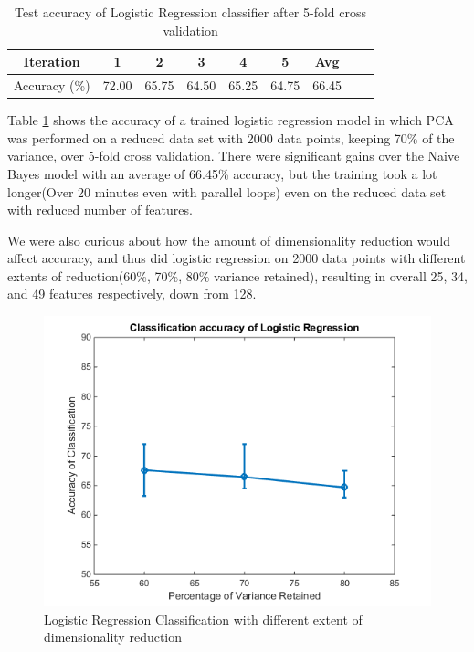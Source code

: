 \documentclass{article} %
\begin{document}
\begin{table}[h]
\centering
\begin{tabular}{|c|c|c|c|c|c|c|c|c|}
\hline
Iteration & 1 & 2 & 3 & 4 & 5 & Avg \\
\hline
Accuracy (\%) & 72.00 & 65.75 & 64.50 & 65.25 & 64.75 & 66.45 \\
\hline
\end{tabular}
\caption{Test accuracy of Logistic Regression classifier after 5-fold cross validation}
\label{tab:mid-logr-results}
\end{table}

Table \ref{tab:mid-logr-results} shows the accuracy of a trained logistic regression model in which PCA was performed on a reduced data set with 2000 data points, keeping 70\% of the variance, over 5-fold cross validation. There were significant gains over the Naive Bayes model with an average of 66.45\% accuracy, but the training took a lot longer(Over 20 minutes even with parallel loops) even on the reduced data set with reduced number of features.

We were also curious about how the amount of dimensionality reduction would affect accuracy, and thus did logistic regression on 2000 data points with different extents of reduction(60\%, 70\%, 80\% variance retained), resulting in overall 25, 34, and 49 features respectively, down from 128.

\begin{figure}[h]
\begin{center}
\includegraphics[scale=0.4]{lr_acc.png}
\end{center}
\caption{Logistic Regression Classification with different extent of dimensionality reduction}
\label{fig:lr-dim-red}
\end{figure}
\end{document}
